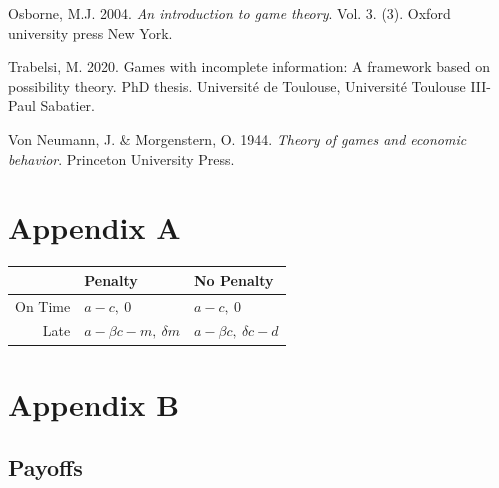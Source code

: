 \documentclass[11pt,preprint, authoryear]{elsarticle}
\let\origtable\table
\let\endorigtable\endtable
\renewenvironment{table}[1][2] {
    \expandafter\origtable\expandafter[H]
} {
    \endorigtable
}
\numberwithin{equation}{section}
\numberwithin{figure}{section}
\numberwithin{table}{section}
\newlength{\cslhangindent}
\newenvironment{CSLReferences}%
  {\setlength{\parindent}{3pt}%
  \everypar{\setlength{\hangindent}{\cslhangindent}}\ignorespaces}%
  {\par}
\begin{document}
\begin{CSLReferences}{1}{0}
\leavevmode\hypertarget{ref-book}{}%
Osborne, M.J. 2004. \emph{An introduction to game theory}. Vol. 3. (3).
Oxford university press New York.

\leavevmode\hypertarget{ref-2020games}{}%
Trabelsi, M. 2020. Games with incomplete information: A framework based
on possibility theory. PhD thesis. Universit{é} de Toulouse,
Universit{é} Toulouse III-Paul Sabatier.

\leavevmode\hypertarget{ref-von}{}%
Von Neumann, J. \& Morgenstern, O. 1944. \emph{Theory of games and
economic behavior}. Princeton University Press.

\end{CSLReferences}

\newpage

\hypertarget{appendix-a}{%
\section*{\texorpdfstring{Appendix A
\label{A}}{Appendix A }}\label{appendix-a}}

\begin{table}[H]
\centering
\begin{tabular}{rll}
  \toprule
 & Penalty & No Penalty \\ 
  \midrule
On Time & $a-c, \ 0$ & $a-c, \ 0$ \\ 
  Late & $a-\beta c - m, \ \delta m$ & $a-\beta c, \ \delta c -d$ \\ 
   \bottomrule
\end{tabular}
\caption{Strategic form of the game \label{tab1}} 
\end{table}

\hypertarget{appendix-b}{%
\section*{\texorpdfstring{Appendix B
\label{B}}{Appendix B }}\label{appendix-b}}

\hypertarget{payoffs}{%
\subsection*{\texorpdfstring{Payoffs
\label{payoff}}{Payoffs }}\label{payoffs}}
\end{document}
